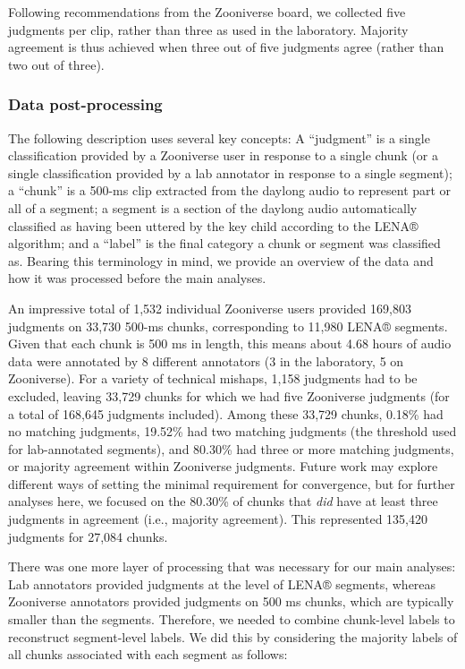 \documentclass[
  english,
  ,man]{apa6}
\begin{document}
Following recommendations from the Zooniverse board, we collected five judgments per clip, rather than three as used in the laboratory. Majority agreement is thus achieved when three out of five judgments agree (rather than two out of three).

\hypertarget{data-post-processing}{%
\subsubsection{Data post-processing}\label{data-post-processing}}

The following description uses several key concepts: A ``judgment'' is a single classification provided by a Zooniverse user in response to a single chunk (or a single classification provided by a lab annotator in response to a single segment); a ``chunk'' is a 500-ms clip extracted from the daylong audio to represent part or all of a segment; a segment is a section of the daylong audio automatically classified as having been uttered by the key child according to the LENA® algorithm; and a ``label'' is the final category a chunk or segment was classified as. Bearing this terminology in mind, we provide an overview of the data and how it was processed before the main analyses.

An impressive total of 1,532 individual Zooniverse users provided 169,803 judgments on 33,730 500-ms chunks, corresponding to 11,980 LENA® segments. Given that each chunk is 500 ms in length, this means about 4.68 hours of audio data were annotated by 8 different annotators (3 in the laboratory, 5 on Zooniverse). For a variety of technical mishaps, 1,158 judgments had to be excluded, leaving 33,729 chunks for which we had five Zooniverse judgments (for a total of 168,645 judgments included). Among these 33,729 chunks, 0.18\% had no matching judgments, 19.52\% had two matching judgments (the threshold used for lab-annotated segments), and 80.30\% had three or more matching judgments, or majority agreement within Zooniverse judgments. Future work may explore different ways of setting the minimal requirement for convergence, but for further analyses here, we focused on the 80.30\% of chunks that \emph{did} have at least three judgments in agreement (i.e., majority agreement). This represented 135,420 judgments for 27,084 chunks.

There was one more layer of processing that was necessary for our main analyses: Lab annotators provided judgments at the level of LENA® segments, whereas Zooniverse annotators provided judgments on 500 ms chunks, which are typically smaller than the segments. Therefore, we needed to combine chunk-level labels to reconstruct segment-level labels. We did this by considering the majority labels of all chunks associated with each segment as follows:
\end{document}
